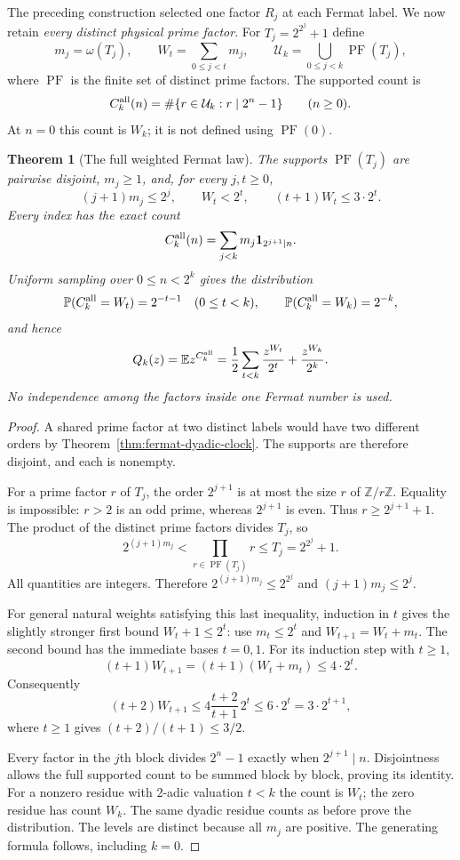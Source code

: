 \documentclass[11pt]{article}
\newtheorem{theorem}{Theorem}[section]
\theoremstyle{definition}
\begin{document}
The preceding construction selected one factor $R_j$ at each Fermat
label. We now retain \emph{every distinct physical prime factor}.
For $T_j=2^{2^j}+1$ define
\[
 m_j=\omega(T_j),\qquad W_t=\sum_{0\le j<t}m_j,\qquad
 \mathcal U_k=\bigcup_{0\le j<k}\operatorname{PF}(T_j),
\]
where $\operatorname{PF}$ is the finite set of distinct prime
factors. The supported count is
\[
 C_k^{\rm all}(n)
 =\#\{r\in\mathcal U_k:r\mid2^n-1\}\qquad(n\ge0).
\]
At $n=0$ this count is $W_k$; it is not defined using
$\operatorname{PF}(0)$.

\begin{theorem}[The full weighted Fermat law]
\label{thm:full-fermat-law}
The supports $\operatorname{PF}(T_j)$ are pairwise disjoint,
$m_j\ge1$, and, for every $j,t\ge0$,
\[
 (j+1)m_j\le2^j,\qquad
 W_t<2^t,\qquad
 (t+1)W_t\le3\cdot2^t.
\]
Every index has the exact count
\[
 C_k^{\rm all}(n)=
 \sum_{j<k}m_j\boldsymbol{1}_{2^{j+1}\mid n}.
\]
Uniform sampling over $0\le n<2^k$ gives the distribution
\[
 \mathbb P(C_k^{\rm all}=W_t)=2^{-t-1}\quad(0\le t<k),
 \qquad
 \mathbb P(C_k^{\rm all}=W_k)=2^{-k},
\]
and hence
\[
 Q_k(z)=\mathbb E z^{C_k^{\rm all}}
       =\frac12\sum_{t<k}\frac{z^{W_t}}{2^t}
          +\frac{z^{W_k}}{2^k}.
\]
No independence among the factors inside one Fermat number
is used.
\end{theorem}

\begin{proof}
A shared prime factor at two distinct labels would have two
different orders by Theorem~\ref{thm:fermat-dyadic-clock}.
The supports are therefore disjoint, and each is nonempty.

For a prime factor $r$ of $T_j$, the order $2^{j+1}$ is at most
the size $r$ of $\mathbb Z/r\mathbb Z$. Equality is impossible:
$r>2$ is an odd prime, whereas $2^{j+1}$ is even.
Thus $r\ge2^{j+1}+1$.
The product of the distinct prime factors divides $T_j$, so
\[
 2^{(j+1)m_j}
 <\prod_{r\in\operatorname{PF}(T_j)}r
 \le T_j=2^{2^j}+1.
\]
All quantities are integers. Therefore
$2^{(j+1)m_j}\le2^{2^j}$ and $(j+1)m_j\le2^j$.

For general natural weights satisfying this last inequality,
induction in $t$ gives the slightly stronger first bound
$W_t+1\le2^t$: use $m_t\le2^t$ and
$W_{t+1}=W_t+m_t$.
The second bound has the immediate bases $t=0,1$.
For its induction step with $t\ge1$,
\[
 (t+1)W_{t+1}
 =(t+1)(W_t+m_t)\le4\cdot2^t.
\]
Consequently
\[
 (t+2)W_{t+1}
 \le4\frac{t+2}{t+1}\,2^t
 \le6\cdot2^t=3\cdot2^{t+1},
\]
where $t\ge1$ gives $(t+2)/(t+1)\le3/2$.

Every factor in the $j$th block divides $2^n-1$ exactly when
$2^{j+1}\mid n$. Disjointness allows the full supported count
to be summed block by block, proving its identity.
For a nonzero residue with $2$-adic valuation $t<k$ the count
is $W_t$; the zero residue has count $W_k$.
The same dyadic residue counts as before prove the distribution.
The levels are distinct because all $m_j$ are positive.
The generating formula follows, including $k=0$.
\end{proof}
\end{document}
